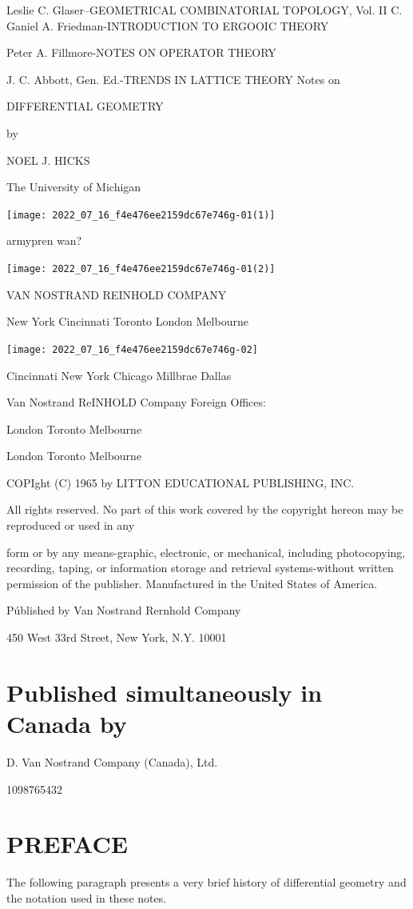 \documentclass[10pt]{article}
\begin{document}
Leslie C. Glaser–GEOMETRICAL COMBINATORIAL TOPOLOGY, Vol. II C. Ganiel A. Friedman-INTRODUCTION TO ERGOOIC THEORY

Peter A. Fillmore-NOTES ON OPERATOR THEORY

J. C. Abbott, Gen. Ed.-TRENDS IN LATTICE THEORY Notes on

DIFFERENTIAL GEOMETRY

by

NOEL J. HICKS

The University of Michigan

\texttt{[image: 2022\_07\_16\_f4e476ee2159dc67e746g-01(1)]}

armypren wan?

\texttt{[image: 2022\_07\_16\_f4e476ee2159dc67e746g-01(2)]}

VAN NOSTRAND REINHOLD COMPANY

New York Cincinnati Toronto London Melbourne

\texttt{[image: 2022\_07\_16\_f4e476ee2159dc67e746g-02]}

Cincinnati New York Chicago Millbrae Dallas

Van Nostrand ReINHOLD Company Foreign Offices:

London Toronto Melbourne

London Toronto Melbourne

COPIght (C) 1965 by LITTON EDUCATIONAL PUBLISHING, INC.

All rights reserved. No part of this work covered by the copyright hereon may be reproduced or used in any

form or by any means-graphic, electronic, or mechanical, including photocopying, recording, taping, or information storage and retrieval systems-without written permission of the publisher. Manufactured in the United States of America.

Públished by Van Nostrand Rernhold Company

450 West 33rd Street, New York, N.Y. 10001

\section{Published simultaneously in Canada by}
D. Van Nostrand Company (Canada), Ltd.

1098765432

\section{PREFACE}
The following paragraph presents a very brief history of differential geometry and the notation used in these notes.
\end{document}
